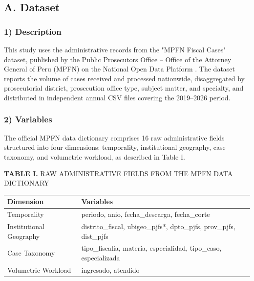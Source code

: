 \documentclass[
  number]{elsarticle}
\newcounter{none} %
\begin{document}
\subsection{A. Dataset}\label{a.-dataset}

\subsubsection{1) Description}\label{description}

This study uses the administrative records from the "MPFN Fiscal Cases"
dataset, published by the Public Prosecutor\textquotesingle s Office --
Office of the Attorney General of Peru (MPFN) on the National Open Data
Platform
\citep{ministerio_publico__fiscalia_de_la_nacion_mpfn_mpfn_2022}. The
dataset reports the volume of cases received and processed nationwide,
disaggregated by prosecutorial district, prosecution office type,
subject matter, and specialty, and distributed in independent annual CSV
files covering the 2019--2026 period.

\subsubsection{2) Variables}\label{variables}

The official MPFN data dictionary comprises 16 raw administrative fields
structured into four dimensions: temporality, institutional geography,
case taxonomy, and volumetric workload, as described in Table I.

\textbf{TABLE I.} RAW ADMINISTRATIVE FIELDS FROM THE MPFN DATA
DICTIONARY

{\def\LTcaptype{none} %
\begin{longtable}[]{@{}
  >{\raggedright\arraybackslash}p{}
  >{\raggedright\arraybackslash}p{}@{}}
\toprule\noalign{}
\begin{minipage}[b]{\linewidth}\raggedright
\textbf{Dimension}
\end{minipage} & \begin{minipage}[b]{\linewidth}\raggedright
\textbf{Variables}
\end{minipage} \\
\midrule\noalign{}
\endhead
\bottomrule\noalign{}
\endlastfoot
Temporality & periodo, anio, fecha\_descarga, fecha\_corte \\
Institutional Geography & distrito\_fiscal, ubigeo\_pjfs*, dpto\_pjfs,
prov\_pjfs, dist\_pjfs \\
Case Taxonomy & tipo\_fiscalia, materia, especialidad, tipo\_caso,
especializada \\
Volumetric Workload & ingresado, atendido \\
\end{longtable}
}
\end{document}
